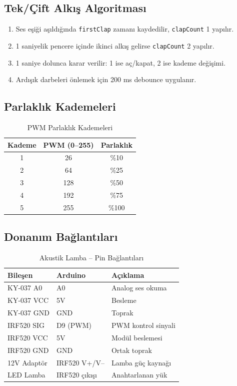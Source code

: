 \documentclass[12pt, a4paper]{article}
\begin{document}
\subsection{Tek/Çift Alkış Algoritması}

\begin{enumerate}[leftmargin=*, label=\arabic*.]
  \item Ses eşiği aşıldığında \texttt{firstClap} zamanı kaydedilir, \texttt{clapCount} 1 yapılır.
  \item 1 saniyelik pencere içinde ikinci alkış gelirse \texttt{clapCount} 2 yapılır.
  \item 1 saniye dolunca karar verilir: 1 ise aç/kapat, 2 ise kademe değişimi.
  \item Ardışık darbeleri önlemek için 200 ms debounce uygulanır.
\end{enumerate}

\subsection{Parlaklık Kademeleri}

\begin{table}[H]
  \centering
  \caption{PWM Parlaklık Kademeleri}
  \begin{tabular}{ccc}
    \toprule
    \textbf{Kademe} & \textbf{PWM (0--255)} & \textbf{Parlaklık} \\
    \midrule
    1 & 26  & \%10  \\
    2 & 64  & \%25  \\
    3 & 128 & \%50  \\
    4 & 192 & \%75  \\
    5 & 255 & \%100 \\
    \bottomrule
  \end{tabular}
\end{table}

\subsection{Donanım Bağlantıları}

\begin{table}[H]
  \centering
  \caption{Akustik Lamba -- Pin Bağlantıları}
  \begin{tabular}{lll}
    \toprule
    \textbf{Bileşen} & \textbf{Arduino} & \textbf{Açıklama} \\
    \midrule
    KY-037 A0  & A0       & Analog ses okuma     \\
    KY-037 VCC & 5V       & Besleme              \\
    KY-037 GND & GND      & Toprak               \\
    IRF520 SIG & D9 (PWM) & PWM kontrol sinyali  \\
    IRF520 VCC & 5V       & Modül beslemesi      \\
    IRF520 GND & GND      & Ortak toprak         \\
    12V Adaptör & IRF520 V+/V-- & Lamba güç kaynağı \\
    LED Lamba  & IRF520 çıkışı & Anahtarlanan yük  \\
    \bottomrule
  \end{tabular}
\end{table}
\end{document}

